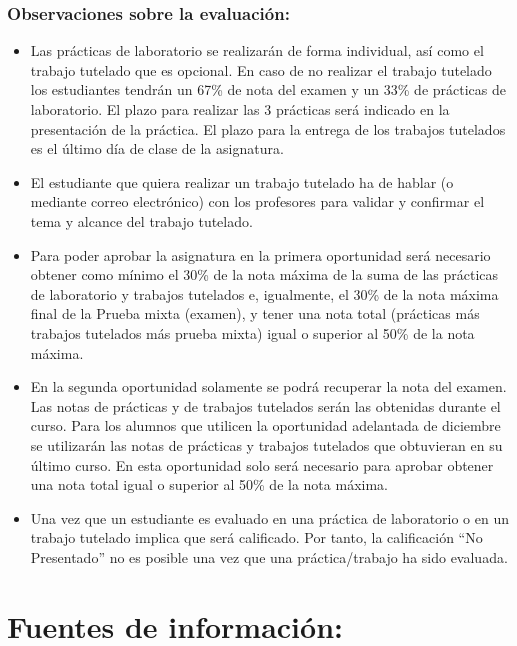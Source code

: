 \documentclass[]{book}
\begin{document}
\subsubsection{Observaciones sobre la
evaluación:}\label{observaciones-sobre-la-evaluaciuxf3n}

\begin{itemize}
\item
  Las prácticas de laboratorio se realizarán de forma individual, así
  como el trabajo tutelado que es opcional. En caso de no realizar el
  trabajo tutelado los estudiantes tendrán un 67\% de nota del examen y
  un 33\% de prácticas de laboratorio. El plazo para realizar las 3
  prácticas será indicado en la presentación de la práctica. El plazo
  para la entrega de los trabajos tutelados es el último día de clase de
  la asignatura.
\item
  El estudiante que quiera realizar un trabajo tutelado ha de hablar (o
  mediante correo electrónico) con los profesores para validar y
  confirmar el tema y alcance del trabajo tutelado.
\item
  Para poder aprobar la asignatura en la primera oportunidad será
  necesario obtener como mínimo el 30\% de la nota máxima de la suma de
  las prácticas de laboratorio y trabajos tutelados e, igualmente, el
  30\% de la nota máxima final de la Prueba mixta (examen), y tener una
  nota total (prácticas más trabajos tutelados más prueba mixta) igual o
  superior al 50\% de la nota máxima.
\item
  En la segunda oportunidad solamente se podrá recuperar la nota del
  examen. Las notas de prácticas y de trabajos tutelados serán las
  obtenidas durante el curso. Para los alumnos que utilicen la
  oportunidad adelantada de diciembre se utilizarán las notas de
  prácticas y trabajos tutelados que obtuvieran en su último curso. En
  esta oportunidad solo será necesario para aprobar obtener una nota
  total igual o superior al 50\% de la nota máxima.
\item
  Una vez que un estudiante es evaluado en una práctica de laboratorio o
  en un trabajo tutelado implica que será calificado. Por tanto, la
  calificación ``No Presentado'' no es posible una vez que una
  práctica/trabajo ha sido evaluada.
\end{itemize}

\section{Fuentes de información:}\label{fuentes-de-informaciuxf3n}
\end{document}
